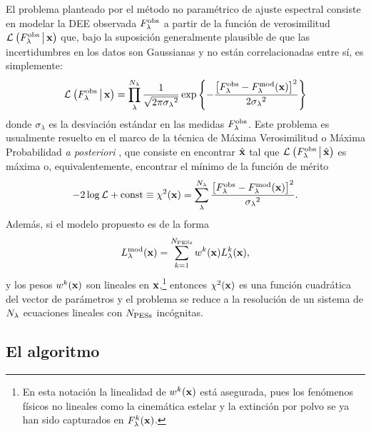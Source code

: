 El problema planteado por el método no paramétrico de ajuste espectral consiste en modelar la DEE
observada $\sedt[F]{obs}$ a partir de la función de verosimilitud $\lik{\sedt[F]{obs}}{\hip}$ que,
bajo la suposición generalmente plausible de que las incertidumbres en los datos son Gaussianas y no
están correlacionadas entre sí, es simplemente:
%
\begin{equation}\label{ec:likelihood}
\lik{\sedt[F]{obs}}{\hip} = \prod_{\lambda}^{\Ni{\lambda}}\frac{1}{\sqrt{2\pi{\sigma_\lambda}^2}}\exp{\left\{-\frac{\left[\sedt[F]{obs}-\sedt[F]{mod}(\hip)\right]^2}{2{\sigma_\lambda}^2}\right\}}
\end{equation}
%
donde $\sigma_\lambda$ es la desviación estándar en las medidas $\sedt[F]{obs}$. Este problema es
usualmente resuelto en el marco de la técnica de Máxima Verosimilitud o Máxima Probabilidad \emph{a
posteriori} \citep[\eg,][]{Heavens2000, CidFernandes2005}, que consiste en encontrar $\hhi$ tal que
$\lik{\sedt[F]{obs}}{\hhi}$ es máxima o, equivalentemente, encontrar el mínimo de la función de
mérito
%
\begin{equation}\label{ec:chi-square}
-2\log{\mathcal{L}}+\text{const}\equiv\chi^2(\hip) = \sum_\lambda^{\Ni{\lambda}}\frac{\left[\sedt[F]{obs}-\sedt[F]{mod}(\hip)\right]^2}{{\sigma_\lambda}^2}.
\end{equation}
%
Además, si el modelo propuesto es de la forma
%
\begin{equation}\label{ec:non-model}
\sedt{mod}(\hip) = \sum_{k=1}^{\Nt{PESs}}w^k(\hip)\sedi{k}(\hip),
\end{equation}
%
y los pesos $w^k(\hip)$ son lineales en $\hip$,\footnote{En esta notación la linealidad de
$w^k({\hip})$ está asegurada, pues los fenómenos físicos no lineales como la cinemática estelar y la
extinción por polvo se ya han sido capturados en $\sedi[F]{k}(\hip)$.} entonces $\chi^2(\hip)$ es
una función cuadrática del vector de parámetros y el problema se reduce a la resolución de un
sistema de $\Ni{\lambda}$ ecuaciones lineales con $\Nt{PESs}$ incógnitas.

\subsection{El algoritmo \emph{\dynbas}}


